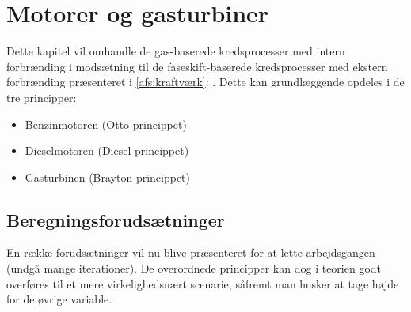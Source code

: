 
\section{Motorer og gasturbiner}
Dette kapitel vil omhandle de gas-baserede kredsprocesser med intern forbrænding i modsætning til de faseskift-baserede kredsprocesser med ekstern forbrænding præsenteret i \autoref{afs:kraftværk}: . Dette kan grundlæggende opdeles i de tre principper:
\begin{itemize}
  \item Benzinmotoren (Otto-princippet)
  \item Dieselmotoren (Diesel-princippet)
  \item Gasturbinen (Brayton-princippet)
\end{itemize}

\subsection{Beregningsforudsætninger}
En række forudsætninger vil nu blive præsenteret for at lette arbejdsgangen (undgå mange iterationer). De overordnede principper kan dog i teorien godt overføres til et mere virkelighedsnært scenarie, såfremt man husker at tage højde for de øvrige variable.

